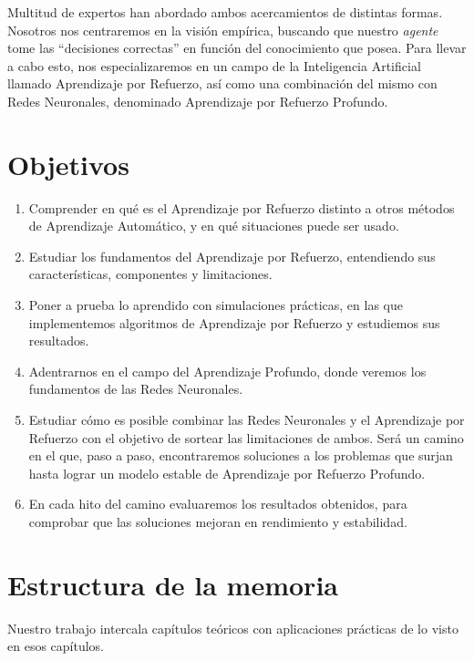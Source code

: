 Multitud de expertos han abordado ambos acercamientos de distintas formas. Nosotros nos centraremos en la visión empírica, buscando que nuestro \textit{agente} tome las ``decisiones correctas'' en función del conocimiento que posea. Para llevar a cabo esto, nos especializaremos en un campo de la Inteligencia Artificial llamado Aprendizaje por Refuerzo, así como una combinación del mismo con Redes Neuronales, denominado Aprendizaje por Refuerzo Profundo.


\section{Objetivos}

\begin{enumerate}
    \item Comprender en qué es el Aprendizaje por Refuerzo distinto a otros métodos de Aprendizaje Automático, y en qué situaciones puede ser usado.
    \item Estudiar los fundamentos del Aprendizaje por Refuerzo, entendiendo sus características, componentes y limitaciones.
    \item Poner a prueba lo aprendido con simulaciones prácticas, en las que implementemos algoritmos de Aprendizaje por Refuerzo y estudiemos sus resultados.
    \item Adentrarnos en el campo del Aprendizaje Profundo, donde veremos los fundamentos de las Redes Neuronales.
    \item Estudiar cómo es posible combinar las Redes Neuronales y el Aprendizaje por Refuerzo con el objetivo de sortear las limitaciones de ambos. Será un camino en el que, paso a paso, encontraremos soluciones a los problemas que surjan hasta lograr un modelo estable de Aprendizaje por Refuerzo Profundo.
    \item En cada hito del camino evaluaremos los resultados obtenidos, para comprobar que las soluciones mejoran en rendimiento y estabilidad.
\end{enumerate}


\section{Estructura de la memoria}

Nuestro trabajo intercala capítulos teóricos con aplicaciones prácticas de lo visto en esos capítulos.

